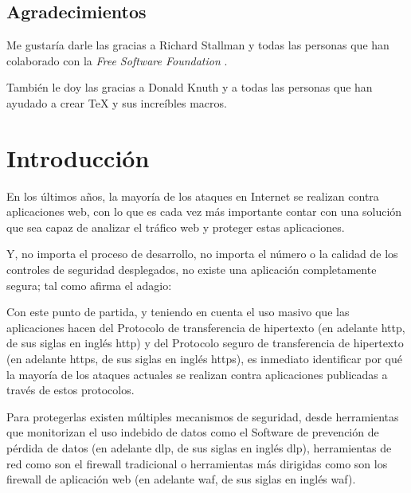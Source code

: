 \clearpage
\section*{Agradecimientos}
\par Me gustaría darle las gracias a Richard Stallman \cite{stallman} y todas las personas que han colaborado con la {\em Free Software Foundation} \cite{fsf}.
\par También le doy las gracias a Donald Knuth \cite{knuth} y a todas las personas que han ayudado a crear TeX \cite{tex} y sus increíbles macros.

\chapter{Introducción}
\par En los últimos años, la mayoría de los ataques en Internet se realizan contra aplicaciones web, con lo que es cada vez más importante contar con una
solución que sea capaz de analizar el tráfico web y proteger estas aplicaciones.
\par Y, no importa el proceso de desarrollo, no importa el número o la calidad de los controles de seguridad desplegados, no existe una aplicación completamente
segura; tal como afirma el adagio:


\par Con este punto de partida, y teniendo en cuenta el uso masivo que las aplicaciones hacen del Protocolo de transferencia de hipertexto (en adelante
\acrshort{http}, de sus siglas en inglés \acrlong{http}) y del Protocolo seguro de transferencia de hipertexto (en adelante \acrshort{https}, de sus siglas en
inglés \acrlong{https}), es inmediato identificar por qué la mayoría de los ataques actuales se realizan contra aplicaciones publicadas a través de estos
protocolos.

\par Para protegerlas existen múltiples mecanismos de seguridad, desde herramientas que monitorizan el uso indebido de datos como el Software de prevención de
pérdida de datos (en adelante \acrshort{dlp}, de sus siglas en inglés \acrlong{dlp}), herramientas de red como son el firewall tradicional o herramientas más
dirigidas como son los firewall de aplicación web (en adelante \acrshort{waf}, de sus siglas en inglés \acrlong{waf}).

